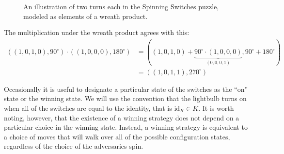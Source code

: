 \begin{example}
\begin{figure}
    \caption{An illustration of two turns each in the Spinning Switches puzzle,
    modeled as elements of a wreath product.}
    \label{fig:WreathProduct}
  \end{figure}

  The multiplication under the wreath product agrees with this: \begin{align*}
    ((1,0,1,0), 90^\circ) \cdot ((1,0,0,0), 180^\circ)
    &= ((1,0,1,0) + \underbrace{90^\circ \cdot (1,0,0,0)}_{(0,0,0,1)}, 90^\circ + 180^\circ) \\
    &= ((1,0,1,1), 270^\circ)
  \end{align*}
\end{example}

Occasionally it is useful to designate a particular state of the switches as the
``on'' state or the winning state. We will use the convention that the lightbulb
turns on when all of the switches are equal to the identity, that is
$\mathrm{id}_K \in K$.
It is worth noting, however, that the existence of a winning strategy does not
depend on a particular choice in the winning state.
Instead, a winning strategy is equivalent to a choice of moves that will walk
over all of the possible configuration states, regardless of the choice of the
adversaries spin.

